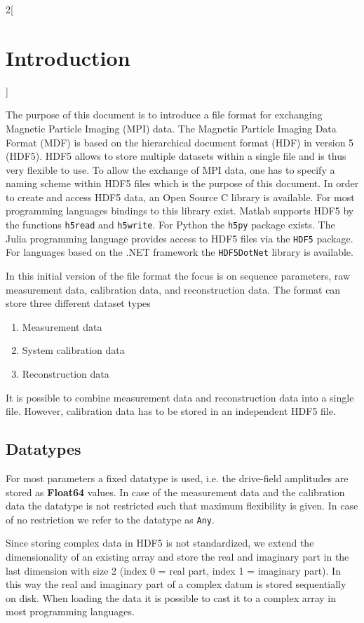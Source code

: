 \documentclass[landscape]{article} %
\newcommand{\inl}[1]{\lstinline[columns=fixed]{#1}}
\newcommand{\inltab}[1]{{\ttfamily\bfseries\color{blue}#1}}
\begin{document}
\begin{multicols}{2}[\section{Introduction} \label{Sec:Introduction}]

The purpose of this document is to introduce a file format for exchanging Magnetic Particle Imaging (MPI) data. The Magnetic Particle Imaging Data Format (MDF) is based on the hierarchical document format (HDF) in version 5 (HDF5). HDF5 allows to store multiple datasets within a single file and is thus very flexible to use. To allow the exchange of MPI data, one has to specify a naming scheme within HDF5 files which is the purpose of this document. In order to create and access HDF5 data, an Open Source C library is available. For most programming languages bindings to this library exist. Matlab supports HDF5 by the functions \inl{h5read} and \inl{h5write}. For Python the \inl{h5py} package exists. The Julia programming language provides access to HDF5 files via the \inl{HDF5} package. For languages based on the .NET framework the \inl{HDF5DotNet} library is available.

In this initial version of the file format the focus is on sequence parameters, raw measurement data, calibration data, and reconstruction data. The format can store three different dataset types
\begin{enumerate}
\item Measurement data
\item System calibration data
\item Reconstruction data
\end{enumerate}
It is possible to combine measurement data and reconstruction data into a single file. However, calibration data has to be stored in an independent HDF5 file.

\subsection{Datatypes}

For most parameters a fixed datatype is used, i.e. the drive-field amplitudes are stored as \inltab{Float64} values. In case of the measurement data and the calibration data the datatype is not restricted such that maximum flexibility is given. In case of no restriction we refer to the datatype as \inl{Any}.

Since storing complex data in HDF5 is not standardized, we extend the dimensionality of an existing array and store the real and imaginary part in the last dimension with size 2 (index 0 = real part, index 1 = imaginary part). In this way the real and imaginary part of a complex datum is stored sequentially on disk. When loading the data it is possible to cast it to a complex array in most programming languages.


\end{multicols}
\end{document}
